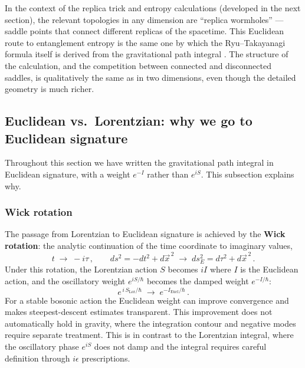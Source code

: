 \documentclass[11pt,letterpaper]{article}
\theoremstyle{plain}
\theoremstyle{definition}
\theoremstyle{remark}
\begin{document}
In the context of the replica trick and entropy calculations (developed in the
next section), the relevant topologies in any dimension are ``replica
wormholes'' --- saddle points that connect different replicas of the spacetime.
This Euclidean route to entanglement entropy is the same one by which the
Ryu--Takayanagi formula itself is derived from the gravitational path integral
\citep{lewkowyczmaldacena2013}.
The structure of the calculation, and the competition between connected and
disconnected saddles, is qualitatively the same as in two dimensions, even though
the detailed geometry is much richer.


\subsection{Euclidean vs.\ Lorentzian: why we go to Euclidean signature}
\label{subsec05:euclidean}

Throughout this section we have written the gravitational path integral in
Euclidean signature, with a weight $e^{-I}$ rather than $e^{iS}$.  This
subsection explains why.

\subsubsection*{Wick rotation}

The passage from Lorentzian to Euclidean signature is achieved by the
\textbf{Wick rotation}: the analytic continuation of the time coordinate to
imaginary values,
\begin{equation}\label{eq05:wick_rotation}
  t \;\longrightarrow\; -i\tau\,,
  \qquad
  ds^2 = -dt^2 + d\vec{x}^{\,2}
  \;\longrightarrow\;
  ds^2_E = d\tau^2 + d\vec{x}^{\,2}\,.
\end{equation}
Under this rotation, the Lorentzian action $S$ becomes $iI$ where $I$ is the
Euclidean action, and the oscillatory weight $e^{iS/\hbar}$ becomes the
damped weight $e^{-I/\hbar}$:
\begin{equation}\label{eq05:wick_action}
  e^{\,i\,S_{\mathrm{Lor}}/\hbar}
  \;\longrightarrow\;
  e^{-I_{\mathrm{Eucl}}/\hbar}\,.
\end{equation}
For a stable bosonic action the Euclidean weight can improve convergence
and makes steepest-descent estimates transparent. This improvement does
not automatically hold in gravity, where the integration contour and
negative modes require separate treatment.  This is in contrast to the Lorentzian integral, where the
oscillatory phase $e^{iS}$ does not damp and the integral requires careful
definition through $i\epsilon$ prescriptions.
\end{document}
